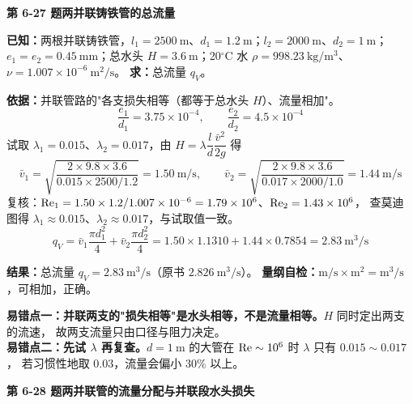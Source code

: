 \noindent\textbf{第 6-27 题\quad 两并联铸铁管的总流量}

\begin{jie}
\textbf{已知：}两根并联铸铁管，$l_1=2500\ \mathrm{m}$、$d_1=1.2\ \mathrm{m}$；$l_2=2000\ \mathrm{m}$、$d_2=1\ \mathrm{m}$；
$e_1=e_2=0.45\ \mathrm{mm}$；总水头 $H=3.6\ \mathrm{m}$；20$^\circ$C 水 $\rho=998.23\ \mathrm{kg/m^3}$、$\nu=1.007\times10^{-6}\ \mathrm{m^2/s}$。
\textbf{求：}总流量 $q_V$。

\textbf{依据：}并联管路的"各支损失相等（都等于总水头 $H$）、流量相加"。
\[ \frac{e_1}{d_1}=3.75\times10^{-4},\qquad \frac{e_2}{d_2}=4.5\times10^{-4} \]
试取 $\lambda_1=0.015$、$\lambda_2=0.017$，由 $H=\lambda\dfrac ld\dfrac{\bar v^2}{2g}$ 得
\[ \bar v_1=\sqrt{\frac{2\times9.8\times3.6}{0.015\times2500/1.2}}=1.50\ \mathrm{m/s},\qquad
\bar v_2=\sqrt{\frac{2\times9.8\times3.6}{0.017\times2000/1.0}}=1.44\ \mathrm{m/s} \]
复核：$\mathrm{Re}_1=1.50\times1.2/1.007\times10^{-6}=1.79\times10^6$、$\mathrm{Re}_2=1.43\times10^6$，
查莫迪图得 $\lambda_1\approx0.015$、$\lambda_2\approx0.017$，与试取值一致。
\[ q_V=\bar v_1\frac{\pi d_1^2}{4}+\bar v_2\frac{\pi d_2^2}{4}
=1.50\times1.1310+1.44\times0.7854=2.83\ \mathrm{m^3/s} \]

\textbf{结果：}总流量 $q_V=2.83\ \mathrm{m^3/s}$（原书 $2.826\ \mathrm{m^3/s}$）。
\textbf{量纲自检：}$\mathrm{m/s\times m^2}=\mathrm{m^3/s}$，可相加，正确。
\end{jie}

\begin{yicuo}
\textbf{易错点一：并联两支的"损失相等"是水头相等，不是流量相等。}$H$ 同时定出两支的流速，
故两支流量只由口径与阻力决定。\\
\textbf{易错点二：先试 $\lambda$ 再复查。}$d=1\ \mathrm{m}$ 的大管在 $\mathrm{Re}\sim10^6$ 时 $\lambda$ 只有 $0.015\sim0.017$，
若习惯性地取 $0.03$，流量会偏小 $30\%$ 以上。
\end{yicuo}

\noindent\textbf{第 6-28 题\quad 两并联管的流量分配与并联段水头损失}

